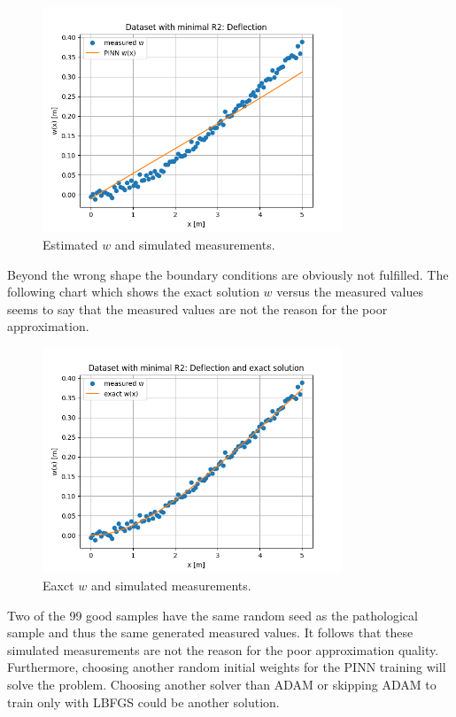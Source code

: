 \documentclass[a4paper,11pt]{article}
\begin{document}
\begin{figure}[H]
    \centering
    \includegraphics[width=0.8\textwidth]{Charts/Dataset with minimal R2Deflection_PINN.png}
    \caption{Estimated $w$ and simulated measurements.}
\end{figure}

Beyond the wrong shape the boundary conditions are obviously not fulfilled. The following chart which shows the exact solution $w$ versus the measured values seems to say that the measured values are not the reason for the poor approximation.

\begin{figure}[H]
    \centering
    \includegraphics[width=0.8\textwidth]{Charts/Dataset with minimal R2Deflection_exact.png}
    \caption{Eaxct $w$ and simulated measurements.}
\end{figure}

Two of the 99 good samples have the same random seed as the pathological sample and thus the same generated measured values. It follows that these simulated measurements are not the reason for the poor approximation quality. Furthermore, choosing another random initial weights for the PINN training will solve the problem. Choosing another solver than ADAM or skipping ADAM to train only with LBFGS could be another solution.
\end{document}
